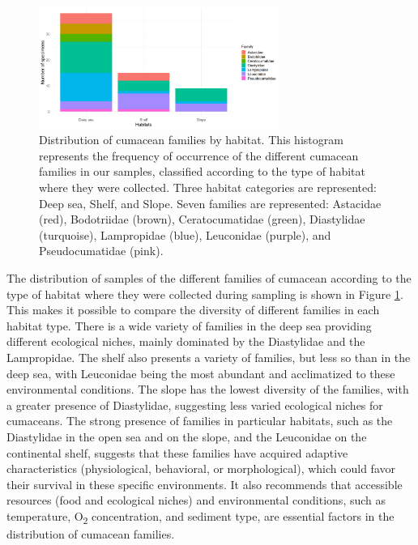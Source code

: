 \begin{figure}[]
    \centering
    \includegraphics[width=0.7\textwidth]{figure4.png}
    \caption{Distribution of cumacean families by habitat. This histogram represents the frequency of occurrence of the different cumacean families in our samples, classified according to the type of habitat where they were collected. Three habitat categories are represented: Deep sea, Shelf, and Slope. Seven families are represented: Astacidae (red), Bodotriidae (brown), Ceratocumatidae (green), Diastylidae (turquoise), Lampropidae (blue), Leuconidae (purple), and Pseudocumatidae (pink). \label{fig:fig5}}
\end{figure}

The distribution of samples of the different families of cumacean according to the type of habitat where they were collected during sampling is shown in Figure \ref{fig:fig5}. This makes it possible to compare the diversity of different families in each habitat type. There is a wide variety of families in the deep sea providing different ecological niches, mainly dominated by the Diastylidae and the Lampropidae. The shelf also presents a variety of families, but less so than in the deep sea, with Leuconidae being the most abundant and acclimatized to these environmental conditions. The slope has the lowest diversity of the families, with a greater presence of Diastylidae, suggesting less varied ecological niches for cumaceans. The strong presence of families in particular habitats, such as the Diastylidae in the open sea and on the slope, and the Leuconidae on the continental shelf, suggests that these families have acquired adaptive characteristics (physiological, behavioral, or morphological), which could favor their survival in these specific environments. It also recommends that accessible resources (food and ecological niches) and environmental conditions, such as temperature, O\textsubscript{2} concentration, and sediment type, are essential factors in the distribution of cumacean families.

